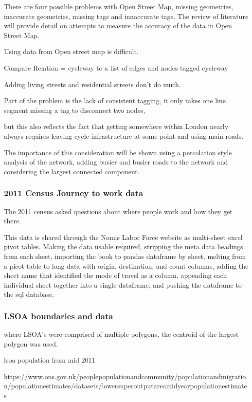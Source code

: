\documentclass[11pt]{article} %
\begin{document}
There are four possible problems with Open Street Map, missing geometries, inaccurate geometries, missing tags and innaccurate tags. The review of literature will provide detail on attempts to measure the accuracy of the data in Open Street Map. 

Using data from Open street map is difficult. 

Compare Relation = cycleway to a list of edges and nodes tagged cycleway

Adding living streets and residential streets don't do much. 

Part of the problem is the lack of consistent tagging, it only takes one line segment missing a tag to disconnect two nodes,

but this also reflects the fact that getting somewhere within London nearly always requires leaving cycle infrastructure at some point and using main roads. 

The importance of this consideration will be shown using a percolation style analysis of the network, adding busier and busier roads to the network and considering the largest connected component. 

\subsubsection{2011 Census Journey to work data}

The 2011 census asked questions about where people work and how they get there. 

This data is shared through the Nomis Labor Force website as multi-sheet excel pivot tables. Making the data usable required, stripping the meta data headings from each sheet, importing the book to pandas dataframe by sheet, melting from a picot table to long data with origin, destination, and count columns, adding the sheet name that identified the mode of travel as a column, appending each individual sheet together into a single dataframe, and pushing the dataframe to the sql database. 

\subsubsection{LSOA boundaries and data}

where LSOA's were comprised of multiple polygons, the centroid of the largest polygon was used. 

lsoa population from mid 2011 

https://www.ons.gov.uk/peoplepopulationandcommunity/populationandmigration/populationestimates/datasets/lowersuperoutputareamidyearpopulationestimates
\end{document}
